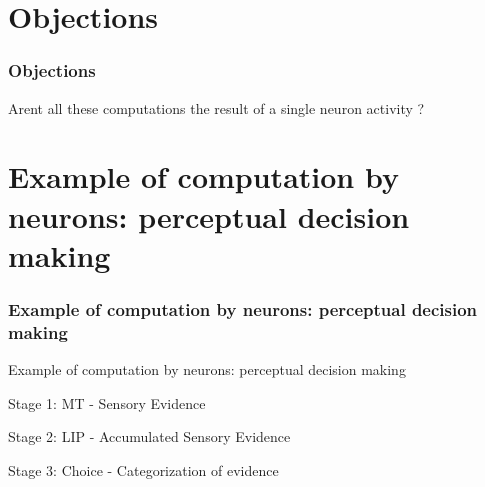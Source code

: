 \documentclass{beamer}
\begin{document}

\section{Objections}
\begin{frame}
\frametitle{\textbf{Objections} }
Arent all these computations the result of a single neuron activity ?

\end{frame}


\section{Example of computation by neurons: perceptual decision making}
\begin{frame}
\frametitle{\textbf{Example of computation by neurons: perceptual decision making} }
Example of computation by neurons: perceptual decision making


Stage 1: MT - Sensory Evidence

Stage 2: LIP - Accumulated Sensory Evidence

Stage 3: Choice - Categorization of evidence

\end{frame}

\end{document}
